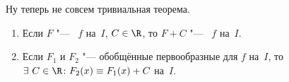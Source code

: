  Ну теперь не совсем тривиальная теорема.
    \begin{enumerate}
      \item Если $F$ "--- \op\ $f$ на~$I$, $C\in\R$, то $F+C$ "--- \op\ $f$ на~$I$.

      \item Если $F_1$ и $F_2$ "--- обобщённые первообразные для $f$ на~$I$, то
      $\exists\  C\in\R\colon F_2(x)\equiv F_1(x)+C$ на~$I$.
    \end{enumerate}



